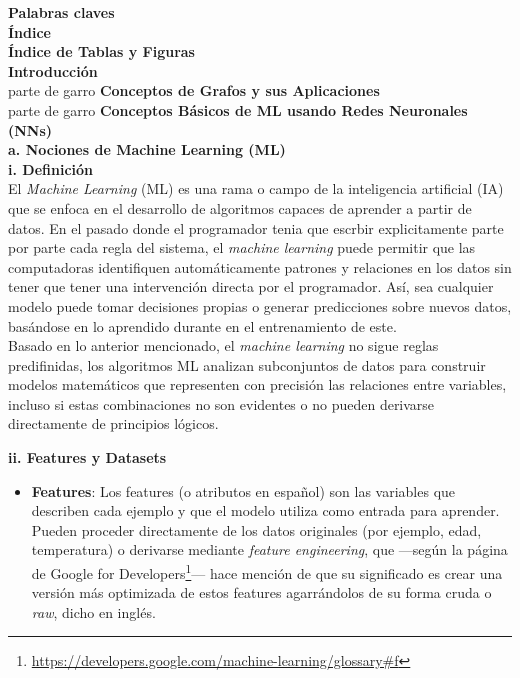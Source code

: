 \documentclass[11pt]{article} %
\begin{document}
\newpage
\thispagestyle{empty}
{\large \textbf{Palabras claves}} \\[5pt]
\newpage
\thispagestyle{empty}
{\large \textbf{Índice}} \\[5pt]

\newpage
\thispagestyle{empty}
{\large \textbf{Índice de Tablas y Figuras}} \\[5pt]

\newpage
\thispagestyle{empty}
{\large \textbf{Introducción}} \\[5pt]
parte de garro
\newpage
\thispagestyle{empty}
{\large \textbf{Conceptos de Grafos y sus Aplicaciones}} \\[5pt]
parte de garro
\newpage
\thispagestyle{empty}
{\large \textbf{Conceptos Básicos de ML usando Redes Neuronales (NNs)}} \\[10pt]

\textbf{a. Nociones de Machine Learning (ML)} \\[5pt]

\textbf{i. Definición} \\[3pt]
El \textit{Machine Learning} (ML) es una rama o campo de la inteligencia artificial (IA) que se enfoca en el desarrollo de algoritmos capaces de aprender a partir de datos. En el pasado donde el programador tenia que escrbir explicitamente parte por parte cada regla del sistema, el \textit{machine learning} puede permitir que las computadoras identifiquen automáticamente patrones y relaciones en los datos sin tener que tener una intervención directa por el programador. Así, sea cualquier modelo puede tomar decisiones propias o generar predicciones sobre nuevos datos, basándose en lo aprendido durante en el entrenamiento de este. \\[3pt]
Basado en lo anterior mencionado, el \textit{machine learning} no sigue reglas predifinidas, los algoritmos ML analizan subconjuntos de datos para construir modelos matemáticos que representen con precisión las relaciones entre variables, incluso si estas combinaciones no son evidentes o no pueden derivarse directamente de principios lógicos.

\vspace{8pt}
\textbf{ii. Features y Datasets} \\[2pt]
\begin{itemize}
    \item \textbf{Features}: Los features (o atributos en español) son las variables que describen cada ejemplo y que el modelo utiliza como entrada para aprender. 
    Pueden proceder directamente de los datos originales (por ejemplo, edad, temperatura) o derivarse mediante \textit{feature engineering}, que —según la página de Google for Developers\footnote{\url{https://developers.google.com/machine-learning/glossary\#f}}— hace mención de que su significado es crear una versión más optimizada de estos features agarrándolos de su forma cruda o \textit{raw}, dicho en inglés.
\end{itemize}
\end{document}

